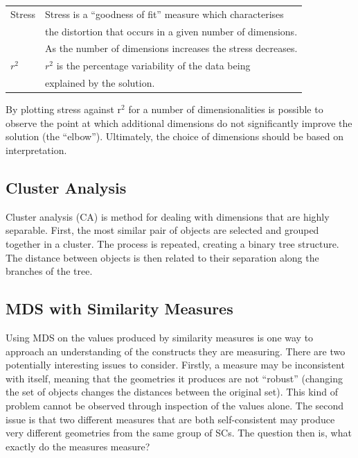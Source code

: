 \documentclass{article}
\begin{document}
\begin{center}
\begin{tabular}{ll}
 Stress  &  Stress is a ``goodness of fit'' measure which characterises  \\
         &  the distortion that occurs in a given number of dimensions.  \\
         &  As the number of dimensions increases the stress decreases.  \\
 $r^2$   &  $r^2$ is the percentage variability of the data being        \\
         &  explained by the solution.                                   \\
\end{tabular}
\end{center}


By plotting stress against r$^2$ for a number of dimensionalities is
possible to observe the point at which additional dimensions do not
significantly improve the solution (the ``elbow''). Ultimately, the
choice of dimensions should be based on interpretation.
\subsection{Cluster Analysis}
\label{sec-4-2}

Cluster analysis (CA) is method for dealing with dimensions that are
highly separable. First, the most similar pair of objects are selected
and grouped together in a cluster. The process is repeated, creating a
binary tree structure. The distance between objects is then related to
their separation along the branches of the tree.
\subsection{MDS with Similarity Measures}
\label{sec-4-3}

Using MDS on the values produced by similarity measures is one way to
approach an understanding of the constructs they are measuring. There
are two potentially interesting issues to consider. Firstly, a measure
may be inconsistent with itself, meaning that the geometries it
produces are not ``robust'' (changing the set of objects changes the
distances between the original set). This kind of problem cannot be
observed through inspection of the values alone. The second issue is
that two different measures that are both self-consistent may produce
very different geometries from the same group of SCs. The question
then is, what exactly do the measures measure?
\end{document}
